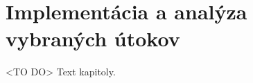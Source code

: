 \chapter{Implementácia a analýza vybraných útokov}
\label{kap:implementacia}

<TO DO> Text kapitoly.